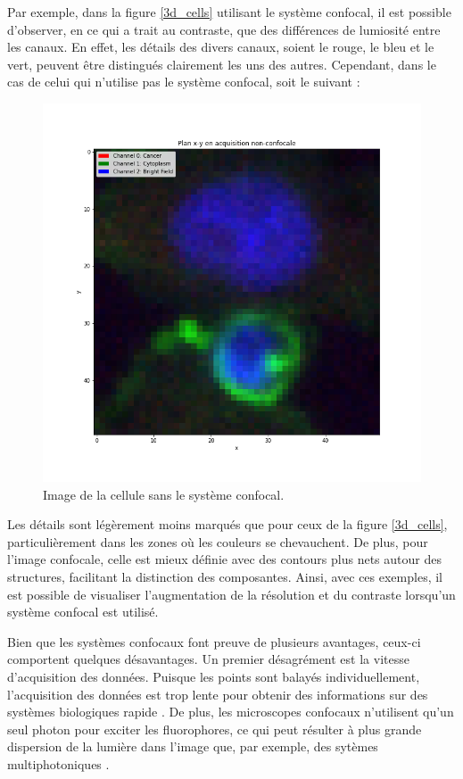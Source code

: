 \documentclass[11pt,letterpaper]{article}
\begin{document}
Par exemple, dans la figure \ref{3d_cells} utilisant le système confocal, il est possible d'observer, en ce qui a trait au contraste, que des différences de lumiosité entre les canaux. En effet, les détails des divers canaux, soient le rouge, le bleu et le vert, peuvent être distingués clairement les uns des autres. Cependant, dans le cas de celui qui n'utilise pas le système confocal, soit le suivant :
\begin{figure}[H]
  \centering
  \includegraphics[scale=0.35]{xy_plane_non_confocal.png}
  \caption{Image de la cellule sans le système confocal.}
  \label{non-confocal}
\end{figure}
Les détails sont légèrement moins marqués que pour ceux de la figure \ref{3d_cells}, particulièrement dans les zones où les couleurs se chevauchent. De plus, pour l'image confocale, celle est mieux définie avec des contours plus nets autour des structures, facilitant la distinction des composantes. Ainsi, avec ces exemples, il est possible de visualiser l'augmentation de la résolution et du contraste lorsqu'un système confocal est utilisé.

Bien que les systèmes confocaux font preuve de plusieurs avantages, ceux-ci comportent quelques désavantages. Un premier désagrément est la vitesse d'acquisition des données. Puisque les points sont balayés individuellement, l'acquisition des données est trop lente pour obtenir des informations sur des systèmes biologiques rapide \cite{st_croix_confocal_2005}. De plus, les microscopes confocaux n'utilisent qu'un seul photon pour exciter les fluorophores, ce qui peut résulter à plus grande dispersion de la lumière dans l'image que, par exemple, des sytèmes multiphotoniques \cite{francis_confocal_2023}.
\end{document}
